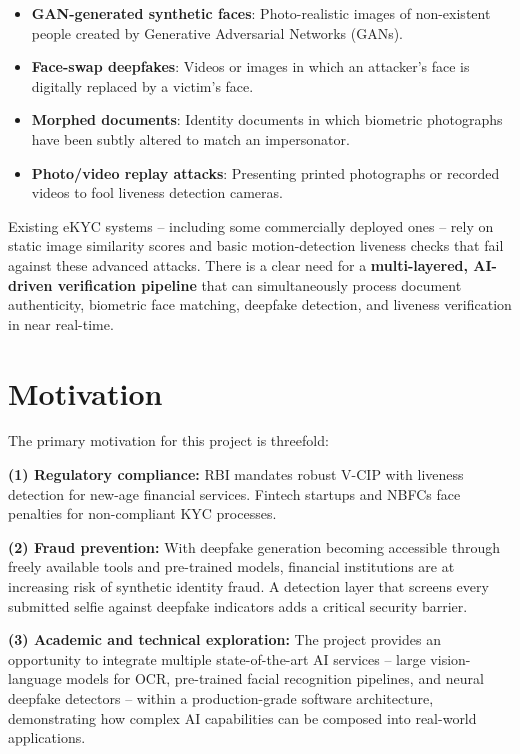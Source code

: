 \documentclass[12pt,a4paper]{report}
\begin{document}
\begin{itemize}
    \item \textbf{GAN-generated synthetic faces}: Photo-realistic images of non-existent people created by Generative Adversarial Networks (GANs).
    \item \textbf{Face-swap deepfakes}: Videos or images in which an attacker's face is digitally replaced by a victim's face.
    \item \textbf{Morphed documents}: Identity documents in which biometric photographs have been subtly altered to match an impersonator.
    \item \textbf{Photo/video replay attacks}: Presenting printed photographs or recorded videos to fool liveness detection cameras.
\end{itemize}

Existing eKYC systems -- including some commercially deployed ones -- rely on static image similarity scores and basic motion-detection liveness checks that fail against these advanced attacks. There is a clear need for a \textbf{multi-layered, AI-driven verification pipeline} that can simultaneously process document authenticity, biometric face matching, deepfake detection, and liveness verification in near real-time.

\section{Motivation}

The primary motivation for this project is threefold:

\textbf{(1) Regulatory compliance:} RBI mandates robust V-CIP with liveness detection for new-age financial services. Fintech startups and NBFCs face penalties for non-compliant KYC processes.

\textbf{(2) Fraud prevention:} With deepfake generation becoming accessible through freely available tools and pre-trained models, financial institutions are at increasing risk of synthetic identity fraud. A detection layer that screens every submitted selfie against deepfake indicators adds a critical security barrier.

\textbf{(3) Academic and technical exploration:} The project provides an opportunity to integrate multiple state-of-the-art AI services -- large vision-language models for OCR, pre-trained facial recognition pipelines, and neural deepfake detectors -- within a production-grade software architecture, demonstrating how complex AI capabilities can be composed into real-world applications.
\end{document}
